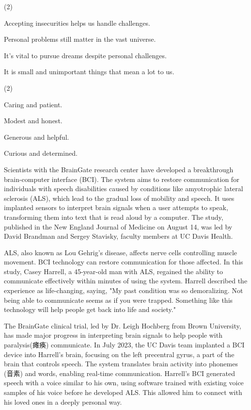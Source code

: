 \documentclass{英语试卷}
\begin{document}
\begin{choices}(2)
  \item Accepting insecurities helps us handle challenges.
  \item Personal problems still matter in the vast universe.
  \item It's vital to pursue dreams despite personal challenges.
  \item It is small and unimportant things that mean a lot to us.
\end{choices}
\begin{choices}(2)
  \item Caring and patient.
  \item Modest and honest.
  \item Generous and helpful.
  \item Curious and determined.
\end{choices}
\par Scientists with the BrainGate research center have developed a breakthrough brain-computer interface (BCI). The system aims to restore communication for individuals with speech disabilities caused by conditions like amyotrophic lateral sclerosis (ALS), which lead to the gradual loss of mobility and speech. It uses implanted sensors to interpret brain signals when a user attempts to speak, transforming them into text that is read aloud by a computer. The study, published in the New England Journal of Medicine on August 14, was led by David Brandman and Sergey Stavisky, faculty members at UC Davis Health.\par
\par ALS, also known as Lou Gehrig's disease, affects nerve cells controlling muscle movement. BCI technology can restore communication for those affected. In this study, Casey Harrell, a 45-year-old man with ALS, regained the ability to communicate effectively within minutes of using the system. Harrell described the experience as life-changing, saying, "My past condition was so demoralizing. Not being able to communicate seems as if you were trapped. Something like this technology will help people get back into life and society."\par
\par The BrainGate clinical trial, led by Dr. Leigh Hochberg from Brown University, has made major progress in interpreting brain signals to help people with paralysis(瘫痪) communicate. In July 2023, the UC Davis team implanted a BCI device into Harrell's brain, focusing on the left precentral gyrus, a part of the brain that controls speech. The system translates brain activity into phonemes (音素) and words, enabling real-time communication. Harrell's BCI generated speech with a voice similar to his own, using software trained with existing voice samples of his voice before he developed ALS. This allowed him to connect with his loved ones in a deeply personal way.\par
\end{document}
